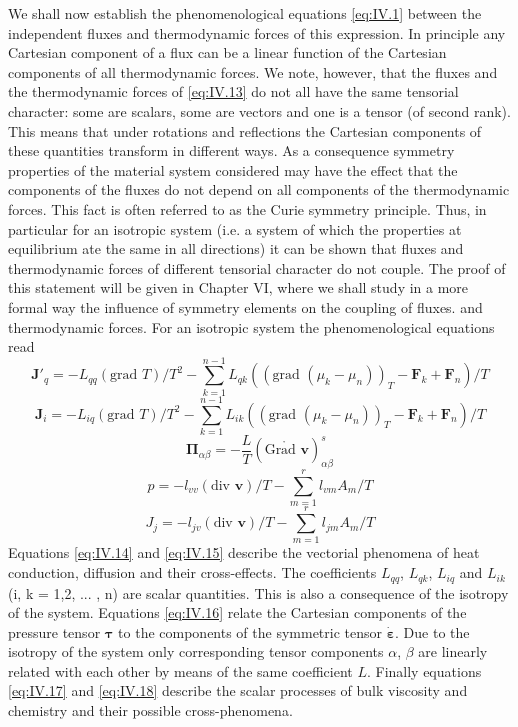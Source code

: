 We shall now establish the phenomenological equations \eqref{eq:IV.1} between the independent fluxes and thermodynamic forces of this expression. In principle any Cartesian component of a flux can be a linear function of the Cartesian components of all thermodynamic forces. We note, however, that the fluxes and the thermodynamic forces of \eqref{eq:IV.13} do not all have the same tensorial character: some are scalars, some are vectors and one is a tensor (of second rank). This means that under rotations and reflections the Cartesian components of these quantities transform in different ways. As a consequence symmetry properties of the material system considered may have the effect that the components of the fluxes do not depend on all components of the thermodynamic forces. This fact is often referred to as the Curie symmetry principle. Thus, in particular for an isotropic system (i.e. a system of which the properties at equilibrium ate the same in all directions) it can be shown that fluxes and thermodynamic forces of different tensorial character do not couple. The proof of this statement will be given in Chapter VI, where we shall study in a more formal way the influence of symmetry elements on the coupling of fluxes. and thermodynamic forces. For an isotropic system the phenomenological equations read
\begin{equation}
\bm{J}'_q = - L_{qq} (\textrm{grad } T)/T^2 - \sum_{k=1}^{n-1} L_{qk} ((\textrm{grad } (\mu_k - \mu_n))_T - \bm{F}_k + \bm{F}_n)/T
    \label{eq:IV.14}
\end{equation}
\begin{equation}
\bm{J}_i = - L_{iq} (\textrm{grad } T)/T^2 - \sum_{k=1}^{n-1} L_{ik} ((\textrm{grad } (\mu_k - \mu_n))_T - \bm{F}_k + \bm{F}_n)/T
    \label{eq:IV.15}
\end{equation}
\begin{equation}
\bm{\Pi}_{\alpha \beta} = -\frac{L}{T} (\mathring{\textrm{Grad } \bm{v}})_{\alpha \beta}^s
    \label{eq:IV.16}
\end{equation}
\begin{equation}
p = -l_{vv} (\textrm{div } \bm{v})/T - \sum_{m=1}^r l_{vm} A_m / T
\label{eq:IV.17}
\end{equation}
\begin{equation}
J_j = -l_{jv} (\textrm{div } \bm{v}) / T - \sum_{m=1}^r l_{jm} A_m / T
    \label{eq:IV.18}
\end{equation}
Equations \eqref{eq:IV.14} and \eqref{eq:IV.15} describe the vectorial phenomena of heat conduction, diffusion and their cross-effects. The coefficients $L_{qq}$, $L_{qk}$, $L_{iq}$ and $L_{ik}$ (i, k = 1,2, ... , n) are scalar quantities. This is also a consequence of the isotropy of the system. Equations \eqref{eq:IV.16} relate the Cartesian components of the pressure tensor $\bm{\tau}$ to the components of the symmetric tensor $\dot{\bm{\varepsilon}}$. Due to the isotropy of the system only corresponding tensor components $\alpha$, $\beta$ are linearly related with each other by means of the same coefficient $L$. Finally equations \eqref{eq:IV.17} and \eqref{eq:IV.18} describe the scalar processes of bulk viscosity and chemistry and their possible cross-phenomena.

